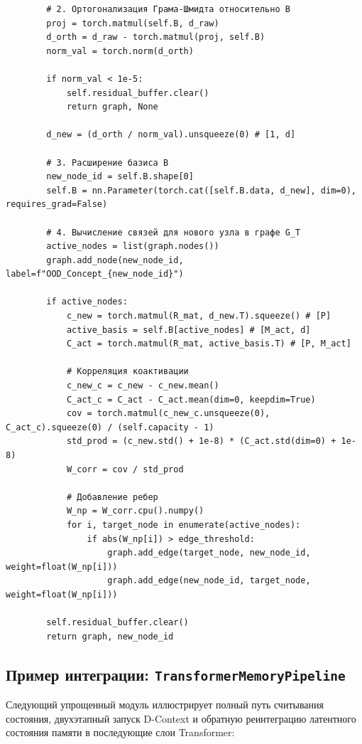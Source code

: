 \documentclass[11pt,a4paper]{article}
\begin{document}
\begin{lstlisting}
        # 2. Ортогонализация Грама-Шмидта относительно B
        proj = torch.matmul(self.B, d_raw)
        d_orth = d_raw - torch.matmul(proj, self.B)
        norm_val = torch.norm(d_orth)
        
        if norm_val < 1e-5:
            self.residual_buffer.clear()
            return graph, None
            
        d_new = (d_orth / norm_val).unsqueeze(0) # [1, d]
        
        # 3. Расширение базиса B
        new_node_id = self.B.shape[0]
        self.B = nn.Parameter(torch.cat([self.B.data, d_new], dim=0), requires_grad=False)
        
        # 4. Вычисление связей для нового узла в графе G_T
        active_nodes = list(graph.nodes())
        graph.add_node(new_node_id, label=f"OOD_Concept_{new_node_id}")
        
        if active_nodes:
            c_new = torch.matmul(R_mat, d_new.T).squeeze() # [P]
            active_basis = self.B[active_nodes] # [M_act, d]
            C_act = torch.matmul(R_mat, active_basis.T) # [P, M_act]
            
            # Корреляция коактивации
            c_new_c = c_new - c_new.mean()
            C_act_c = C_act - C_act.mean(dim=0, keepdim=True)
            cov = torch.matmul(c_new_c.unsqueeze(0), C_act_c).squeeze(0) / (self.capacity - 1)
            std_prod = (c_new.std() + 1e-8) * (C_act.std(dim=0) + 1e-8)
            W_corr = cov / std_prod
            
            # Добавление ребер
            W_np = W_corr.cpu().numpy()
            for i, target_node in enumerate(active_nodes):
                if abs(W_np[i]) > edge_threshold:
                    graph.add_edge(target_node, new_node_id, weight=float(W_np[i]))
                    graph.add_edge(new_node_id, target_node, weight=float(W_np[i]))
                    
        self.residual_buffer.clear()
        return graph, new_node_id
\end{lstlisting}

\subsection*{Пример интеграции: \texttt{TransformerMemoryPipeline}}

Следующий упрощенный модуль иллюстрирует полный путь считывания состояния, двухэтапный запуск D-Context и обратную реинтеграцию латентного состояния памяти в последующие слои Transformer:
\end{document}
